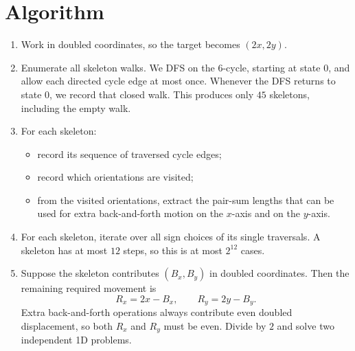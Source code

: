 \documentclass[11pt]{article}
\begin{document}
\section*{Algorithm}

\begin{enumerate}[leftmargin=*]
    \item Work in doubled coordinates, so the target becomes $(2x,2y)$.

    \item Enumerate all skeleton walks. We DFS on the 6-cycle, starting at state $0$, and allow each directed cycle edge at most once. Whenever the DFS returns to state $0$, we record that closed walk. This produces only $45$ skeletons, including the empty walk.

    \item For each skeleton:
    \begin{itemize}[leftmargin=*]
        \item record its sequence of traversed cycle edges;
        \item record which orientations are visited;
        \item from the visited orientations, extract the pair-sum lengths that can be used for extra back-and-forth motion on the $x$-axis and on the $y$-axis.
    \end{itemize}

    \item For each skeleton, iterate over all sign choices of its single traversals. A skeleton has at most $12$ steps, so this is at most $2^{12}$ cases.

    \item Suppose the skeleton contributes $(B_x,B_y)$ in doubled coordinates. Then the remaining required movement is
    \[
    R_x = 2x - B_x,\qquad R_y = 2y - B_y.
    \]
    Extra back-and-forth operations always contribute even doubled displacement, so both $R_x$ and $R_y$ must be even. Divide by $2$ and solve two independent 1D problems.


\end{enumerate}
\end{document}
